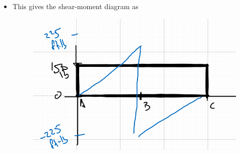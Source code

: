 \documentclass[12pt, oneside]{article}
\begin{document}
\begin{enumerate}
\begin{itemize}
\begin{figure}[H]
					\end{figure}
				\item This gives the shear-moment diagram as
					\begin{figure}[H]
						\centering
						\includegraphics[width=0.6\linewidth]{5-3c}
					\end{figure}
			\end{itemize}


\end{enumerate}
\end{document}
